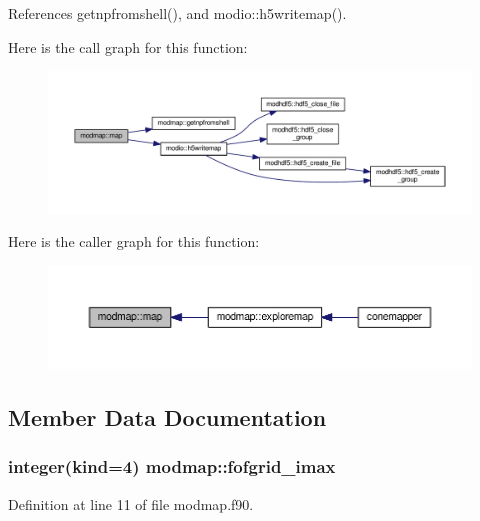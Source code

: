 References getnpfromshell(), and modio\-::h5writemap().



Here is the call graph for this function\-:\nopagebreak
\begin{figure}[H]
\begin{center}
\leavevmode
\includegraphics[width=350pt]{classmodmap_af6328324bc6aaca47018ded5f4c8e8cb_cgraph}
\end{center}
\end{figure}




Here is the caller graph for this function\-:\nopagebreak
\begin{figure}[H]
\begin{center}
\leavevmode
\includegraphics[width=350pt]{classmodmap_af6328324bc6aaca47018ded5f4c8e8cb_icgraph}
\end{center}
\end{figure}




\subsection{Member Data Documentation}
\hypertarget{classmodmap_adf255364fd93d9af29d1f179bf50f5ba}{
\subsubsection[{fofgrid\-\_\-imax}]{\setlength{\rightskip}{0pt plus 5cm}integer(kind=4) modmap\-::fofgrid\-\_\-imax}}\label{classmodmap_adf255364fd93d9af29d1f179bf50f5ba}


Definition at line 11 of file modmap.\-f90.

